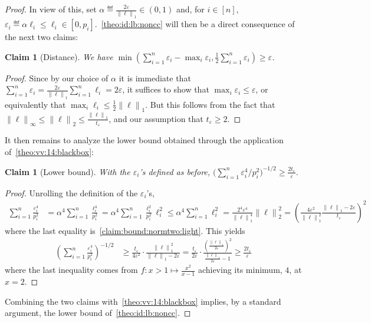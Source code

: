\documentclass[11pt]{article}
\newtheorem{claim}[clm]{Claim}
\theoremstyle{remark}   	\newtheorem{remark}[theorem]{Remark}
\theoremstyle{definition}   	\newaliascnt{defn}{theorem}
\newcommand{\eps}{\ensuremath{\varepsilon}\xspace}
\newcommand{\norm}[1]{\lVert#1{\rVert}}
\newcommand{\normone}[1]{{\norm{#1}}_1}
\newcommand{\normtwo}[1]{{\norm{#1}}_2}
\newcommand{\norminf}[1]{{\norm{#1}}_\infty}
\begin{document}
\begin{proof}
\noindent In view of this, set
$
  \alpha \eqdef \frac{2\eps}{\normone{\ell}} \in (0,1)
$
and, for $i\in[n]$, $\eps_i \eqdef \alpha \ell_i \leq \ell_i \in [0,p_i]$.~\autoref{theo:id:lb:noncc} will then be a direct consequence of the next two claims:

\begin{claim}[Distance] We have
  $\min\left(\sum_{i=1}^n \eps_i - \max_i \eps_i, \frac{1}{2}\sum_{i=1}^n \eps_i\right) \geq \eps$.
\end{claim}
\begin{proof}
Since by our choice of $\alpha$ it is immediate that $\sum_{i=1}^n \eps_i = \frac{2\eps}{\normone{\ell}}\sum_{i=1}^n \ell_i = 2\eps$, it suffices to show that $\max_i \eps_i \leq \eps$, or equivalently that $\max_i \ell_i \leq \frac{1}{2}\normone{\ell}$. But this follows from the fact that $\norminf{\ell} \leq \normtwo{\ell} \leq \frac{\normone{\ell}}{t_\eps}$, and our assumption that $t_\eps\geq 2$.
\end{proof}

It then remains to analyze the lower bound obtained through the application of~\autoref{theo:vv:14:blackbox}:
\begin{claim}[Lower bound]
  With the $\eps_i$'s defined as before,
  $
      \big(\sum_{i=1}^n {\eps_i^4}/{p_i^2}\big)^{-1/2} \geq \frac{2t_\eps}{\eps}.
  $
\end{claim}
\begin{proof}
Unrolling the definition of the $\eps_i$'s,
\begin{align*}
  \sum_{i=1}^n \frac{\eps_i^4}{p_i^2}
    &=  \alpha^4 \sum_{i=1}^n \frac{\ell_i^4}{p_i^2}
    =  \alpha^4 \sum_{i=1}^n \frac{\ell_i^2}{p_i^2} \ell_i^2
    \leq  \alpha^4 \sum_{i=1}^n \ell_i^2 
    = \frac{2^4\eps^4}{\normone{\ell}^4} \normtwo{\ell}^2
    = \left(\frac{4\eps^2}{\normone{\ell}^2} \frac{\normone{\ell}-2\eps}{t_\eps}\right)^2
\end{align*}
where the last equality is~\eqref{claim:bound:normtwo:light}. This yields
\begin{align*}
  \left(\sum_{i=1}^n \frac{\eps_i^4}{p_i^2}\right)^{-1/2} 
  &\geq \frac{t_\eps}{4\eps^2}\cdot \frac{\normone{\ell}^2}{\normone{\ell}-2\eps} 
  = \frac{t_\eps}{2\eps}\cdot \frac{\left(\frac{\normone{\ell}}{2\eps}\right)^2}{\frac{\normone{\ell}}{2\eps}-1} 
  \geq \frac{2t_\eps}{\eps}
\end{align*}
where the last inequality comes from $f\colon x>1 \mapsto \frac{x^2}{x-1}$ achieving its minimum, $4$, at $x=2$.
\end{proof}
Combining the two claims with~\autoref{theo:vv:14:blackbox} implies, by a standard argument, the lower bound of~\autoref{theo:id:lb:noncc}.
\end{proof}
\end{document}
